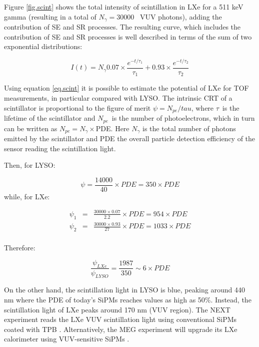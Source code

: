 \documentclass[review]{elsarticle}
\begin{document}
Figure \ref{fig.scint} shows the total intensity of scintillation in LXe for a 511 keV gamma (resulting in a total of $N_\gamma =30000$~ VUV photons), adding the contribution of SE and SR processes. The resulting curve, which includes the contribution of SE and SR processes is well described in terms of the sum of two exponential distributions: 

\begin{equation}
I(t) = N_\gamma 0.07 \times \frac{e^{-t/\tau_1}}{\tau_1} + 0.93 \times \frac{e^{-t/\tau_2}}{\tau_2}
\label{eq.scint}
\end{equation}

Using equation \ref{eq.scint} it is possible to estimate the potential of LXe for TOF measurements, in particular compared with LYSO. The intrinsic CRT of a scintillator is proportional to the figure of merit 
$\psi = N_{pe}/tau$, where $\tau$~is the lifetime of the scintillator and $N_{pe}$~is the number of photoelectrons, which in turn can be written as $N_{pe} = N_\gamma \times $PDE. Here $N_\gamma$ is the total number of photons emitted by the scintillator and PDE the overall particle detection efficiency of the sensor reading the scintillation light. 

Then, for LYSO: 

\begin{equation}
\psi = \frac{14000}{40} \times PDE = 350 \times PDE
\label{eq.lysoScint}
\end{equation}
%
while, for LXe:

\begin{eqnarray}
\psi_1 &=& \frac{30000 \times 0.07}{2.2} \times PDE = 954 \times PDE \\
\psi_2 &=& \frac{30000 \times 0.93}{27} \times PDE = 1033 \times PDE \\
\end{eqnarray}

Therefore:

\begin{equation}
\frac{\psi_{LXe}}{\psi_{LYSO}} = \frac{1987}{350} \sim 6 \times PDE
\label{eq.ratioScint}
\end{equation}

On the other hand, the scintillation light in LYSO is blue, peaking around 440 nm where the PDE of today's SiPMs reaches values as high as 50\%. Instead, the scintillation light of LXe peaks around 170 nm (VUV region). The NEXT experiment reads the LXe VUV scintillation light using conventional SiPMs coated with TPB \cite{Alvarez:2013gxa}. Alternatively, the MEG experiment will upgrade its LXe calorimeter using VUV-sensitive SiPMs \cite{Ogawa:2015ucj}.
\end{document}
